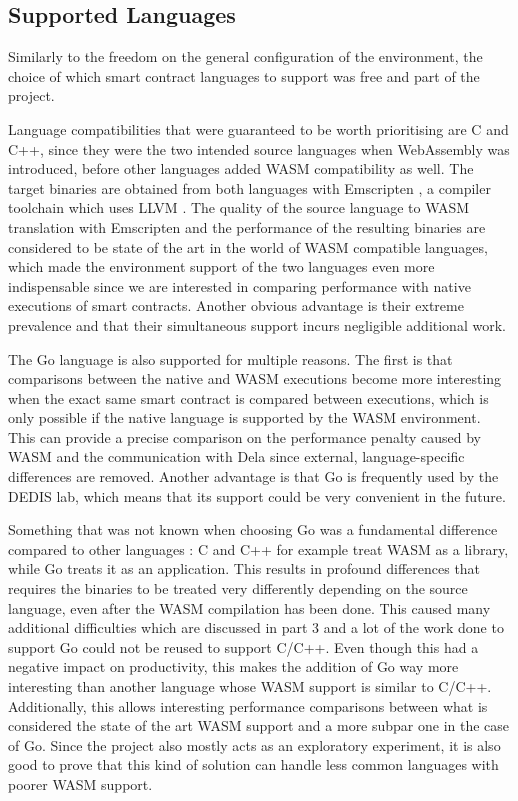 \documentclass[11pt, a4paper, twoside, openright]{article}
\begin{document}
\subsection{Supported Languages}

Similarly to the freedom on the general configuration of the environment, the choice of which smart contract languages to support was free and part of the project.

Language compatibilities that were guaranteed to be worth prioritising are C and C++, since they were the two intended source languages when WebAssembly was introduced, before other languages added WASM compatibility as well. The target binaries are obtained from both languages with Emscripten \cite{emscripten}, a compiler toolchain which uses LLVM \cite{llvm}. The quality of the source language to WASM translation with Emscripten and the performance of the resulting binaries are considered to be state of the art in the world of WASM compatible languages, which made the environment support of the two languages even more indispensable since we are interested in comparing performance with native executions of smart contracts. Another obvious advantage is their extreme prevalence and that their simultaneous support incurs negligible additional work.

The Go language is also supported for multiple reasons. The first is that comparisons between the native and WASM executions become more interesting when the exact same smart contract is compared between executions, which is only possible if the native language is supported by the WASM environment. This can provide a precise comparison on the performance penalty caused by WASM and the communication with Dela since external, language-specific differences are removed. Another advantage is that Go is frequently used by the DEDIS lab, which means that its support could be very convenient in the future.

Something that was not known when choosing Go was a fundamental difference compared to other languages : C and C++ for example treat WASM as a library, while Go treats it as an application. This results in profound differences that requires the binaries to be treated very differently depending on the source language, even after the WASM compilation has been done. This caused many additional difficulties which are discussed in part 3 and a lot of the work done to support Go could not be reused to support C/C++. Even though this had a negative impact on productivity, this makes the addition of Go way more interesting than another language whose WASM support is similar to C/C++. Additionally, this allows interesting performance comparisons between what is considered the state of the art WASM support and a more subpar one in the case of Go. Since the project also mostly acts as an exploratory experiment, it is also good to prove that this kind of solution can handle less common languages with poorer WASM support.
\end{document}
